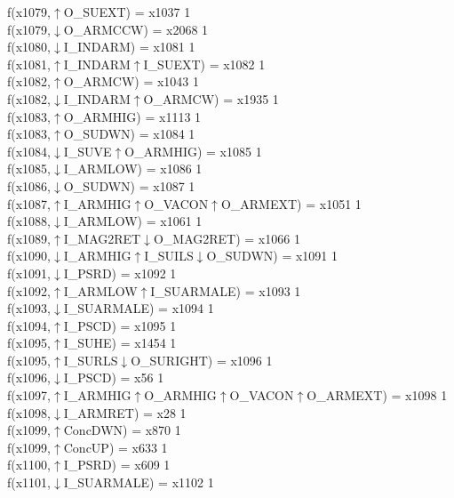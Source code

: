 f(x1079,$\uparrow$O\_SUEXT) = x1037 {1} \\
f(x1079,$\downarrow$O\_ARMCCW) = x2068 {1} \\
f(x1080,$\downarrow$I\_INDARM) = x1081 {1} \\
f(x1081,$\uparrow$I\_INDARM$\uparrow$I\_SUEXT) = x1082 {1} \\
f(x1082,$\uparrow$O\_ARMCW) = x1043 {1} \\
f(x1082,$\downarrow$I\_INDARM$\uparrow$O\_ARMCW) = x1935 {1} \\
f(x1083,$\uparrow$O\_ARMHIG) = x1113 {1} \\
f(x1083,$\uparrow$O\_SUDWN) = x1084 {1} \\
f(x1084,$\downarrow$I\_SUVE$\uparrow$O\_ARMHIG) = x1085 {1} \\
f(x1085,$\downarrow$I\_ARMLOW) = x1086 {1} \\
f(x1086,$\downarrow$O\_SUDWN) = x1087 {1} \\
f(x1087,$\uparrow$I\_ARMHIG$\uparrow$O\_VACON$\uparrow$O\_ARMEXT) = x1051 {1} \\
f(x1088,$\downarrow$I\_ARMLOW) = x1061 {1} \\
f(x1089,$\uparrow$I\_MAG2RET$\downarrow$O\_MAG2RET) = x1066 {1} \\
f(x1090,$\downarrow$I\_ARMHIG$\uparrow$I\_SUILS$\downarrow$O\_SUDWN) = x1091 {1} \\
f(x1091,$\downarrow$I\_PSRD) = x1092 {1} \\
f(x1092,$\uparrow$I\_ARMLOW$\uparrow$I\_SUARMALE) = x1093 {1} \\
f(x1093,$\downarrow$I\_SUARMALE) = x1094 {1} \\
f(x1094,$\uparrow$I\_PSCD) = x1095 {1} \\
f(x1095,$\uparrow$I\_SUHE) = x1454 {1} \\
f(x1095,$\uparrow$I\_SURLS$\downarrow$O\_SURIGHT) = x1096 {1} \\
f(x1096,$\downarrow$I\_PSCD) = x56 {1} \\
f(x1097,$\uparrow$I\_ARMHIG$\uparrow$O\_ARMHIG$\uparrow$O\_VACON$\uparrow$O\_ARMEXT) = x1098 {1} \\
f(x1098,$\downarrow$I\_ARMRET) = x28 {1} \\
f(x1099,$\uparrow$ConcDWN) = x870 {1} \\
f(x1099,$\uparrow$ConcUP) = x633 {1} \\
f(x1100,$\uparrow$I\_PSRD) = x609 {1} \\
f(x1101,$\downarrow$I\_SUARMALE) = x1102 {1} \\
